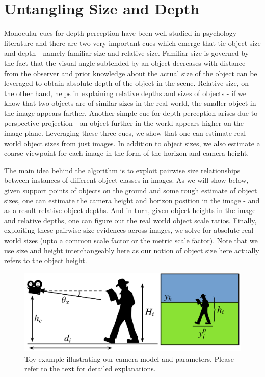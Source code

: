 \section{Untangling Size and Depth}
Monocular cues for depth perception have been well-studied in psychology literature and there are two very important cues which emerge that tie object size and depth -  namely familiar size and relative size. Familiar size is governed by the fact that the visual angle subtended by an object decreases with distance from the observer and prior knowledge about the actual size of the object can be leveraged to obtain absolute depth of the object in the scene. Relative size, on the other hand, helps in explaining relative depths and sizes of objects - if we know that two objects are of similar sizes in the real world, the smaller object in the image appears farther. Another simple cue for depth perception arises due to perspective projection - an object further in the world appears higher on the image plane. Leveraging these three cues, we show that one can estimate real world object sizes from just images. In addition to object sizes, we also estimate a coarse viewpoint for each image in the form of the horizon and camera height. 

The main idea behind the algorithm is to exploit pairwise size relationships between instances of different object classes in images. As we will show below, given support points of objects on the ground and some rough estimate of object sizes, one can estimate the camera height and horizon position in the image - and as a result relative object depths. And in turn, given object heights in the image and relative depths, one can figure out the real world object scale ratios. Finally, exploiting these pairwise size evidences across images, we solve for absolute real world sizes (upto a common scale factor or the metric scale factor). Note that we use size and height interchangeably here as our notion of object size here actually refers to the object height.
\begin{figure}
  \centering
  \includegraphics[width=.9\textwidth]{figures/amodal/Perspective.png}
  \caption{ Toy example illustrating our camera model and parameters. Please refer to the text for detailed explanations. }
\end{figure}

